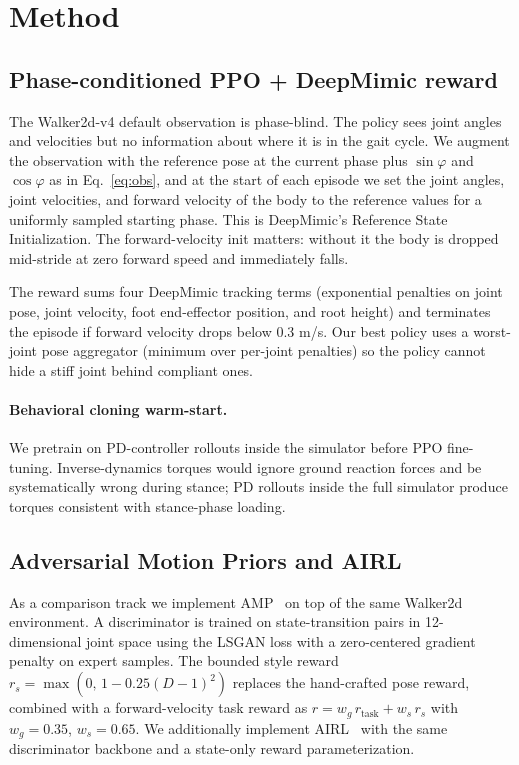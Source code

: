 \documentclass{article}
\begin{document}
\section{Method}
\label{sec:method}

\subsection{Phase-conditioned PPO + DeepMimic reward}
\label{sec:method-ppo}

The Walker2d-v4 default observation is phase-blind. The policy sees
joint angles and velocities but no information about where it is in
the gait cycle. We augment the observation with the reference pose
at the current phase plus $\sin\varphi$ and $\cos\varphi$ as in
Eq.~\ref{eq:obs}, and at the start of each episode we set the joint
angles, joint velocities, and forward velocity of the body to the
reference values for a uniformly sampled starting phase. This is
DeepMimic's Reference State Initialization. The forward-velocity
init matters: without it the body is dropped mid-stride at zero
forward speed and immediately falls.

The reward sums four DeepMimic tracking terms (exponential
penalties on joint pose, joint velocity, foot end-effector
position, and root height) and terminates the episode if forward
velocity drops below 0.3 m/s. Our best policy uses a worst-joint
pose aggregator (minimum over per-joint penalties) so the policy
cannot hide a stiff joint behind compliant ones.

\paragraph{Behavioral cloning warm-start.}
We pretrain on PD-controller rollouts inside the simulator before
PPO fine-tuning. Inverse-dynamics torques would ignore ground
reaction forces and be systematically wrong during stance; PD
rollouts inside the full simulator produce torques consistent
with stance-phase loading.

\subsection{Adversarial Motion Priors and AIRL}
\label{sec:method-amp}

As a comparison track we implement AMP~\cite{peng2021amp,escontrela2022amp}
on top of the same Walker2d environment. A discriminator is trained
on state-transition pairs in 12-dimensional joint space using the
LSGAN loss with a zero-centered gradient penalty on expert samples.
The bounded style reward $r_s = \max(0,\,1 - 0.25(D - 1)^2)$ replaces
the hand-crafted pose reward, combined with a forward-velocity task
reward as $r = w_g\,r_\text{task} + w_s\,r_s$ with $w_g = 0.35$,
$w_s = 0.65$. We additionally implement AIRL~\cite{fu2018airl} with
the same discriminator backbone and a state-only reward
parameterization.
\end{document}
